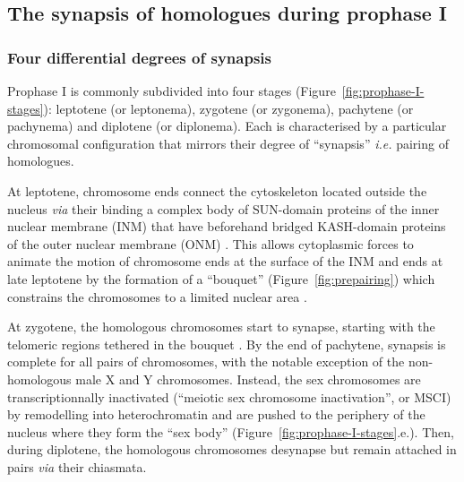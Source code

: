 \subsection{The synapsis of homologues during prophase I}
\label{chap2:prophase-I}

\subsubsection{Four differential degrees of synapsis}
Prophase I is commonly subdivided into four stages (Figure~\ref{fig:prophase-I-stages}): leptotene (or leptonema), zygotene (or zygonema), pachytene (or pachynema) and diplotene (or diplonema).
Each is characterised by a particular chromosomal configuration that mirrors their degree of “synapsis” \textit{i.e.} pairing of homologues.

At leptotene, chromosome ends connect the cytoskeleton located outside the nucleus \citep{scherthan1996centromere} \textit{via} their binding a complex body of SUN-domain proteins of the inner nuclear membrane (INM) that have beforehand bridged KASH-domain proteins of the outer nuclear membrane (ONM) \citep{tzur2006sun, yanowitz2010meiosis}.
This allows cytoplasmic forces to animate the motion of chromosome ends at the surface of the INM \citep{penkner2009meiotic} and ends at late leptotene by the formation of a “bouquet” (Figure~\ref{fig:prepairing}) \citep{zickler1998leptotene} which constrains the chromosomes to a limited nuclear area \citep{zickler2006early}.

At zygotene, the homologous chromosomes start to synapse, starting with the telomeric regions tethered in the bouquet \citep{pfeifer2003sex}.
By the end of pachytene, synapsis is complete for all pairs of chromosomes, with the notable exception of the non-homologous male X and Y chromosomes.
Instead, the sex chromosomes are transcriptionnally inactivated (“meiotic sex chromosome inactivation”, or MSCI) by remodelling into heterochromatin \citep{fernandez2003h2ax} and are pushed to the periphery of the nucleus where they form the “sex body” \citep{handel2004xy} (Figure~\ref{fig:prophase-I-stages}.e.).
Then, during diplotene, the homologous chromosomes desynapse but remain attached in pairs \textit{via} their chiasmata.


